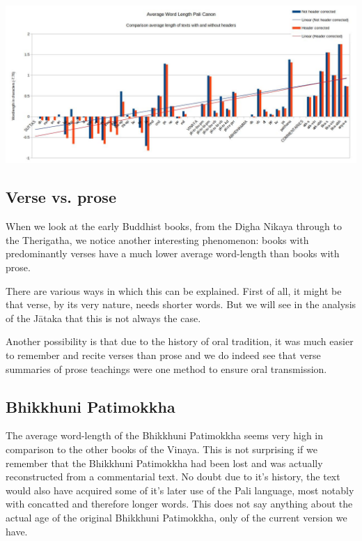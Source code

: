 \includegraphics[width=\linewidth]{chart3.jpg}
\label{chart3}

\subsection{Verse vs. prose}
When we look at the early Buddhist books, from the Digha Nikaya through to the Therigatha, we notice another interesting phenomenon: books with predominantly verses have a much lower average word-length than books with prose.

There are various ways in which this can be explained. First of all, it might be that verse, by its very nature, needs shorter words. But we will see in the analysis of the Jātaka that this is not always the case.

Another possibility is that due to the history of oral tradition, it was much easier to remember and recite verses than prose and we do indeed see that verse summaries of prose teachings were one method to ensure oral transmission.

\subsection{Bhikkhuni Patimokkha}
The average word-length of the Bhikkhuni Patimokkha seems very high in comparison to the other books of the Vinaya. This is not surprising if we remember that the Bhikkhuni Patimokkha had been lost and was actually reconstructed from a commentarial text. No doubt due to it's history, the text would also have acquired some of it's later use of the Pali language, most notably with concatted and therefore longer words. This does not say anything about the actual age of the original Bhikkhuni Patimokkha, only of the current version we have.

